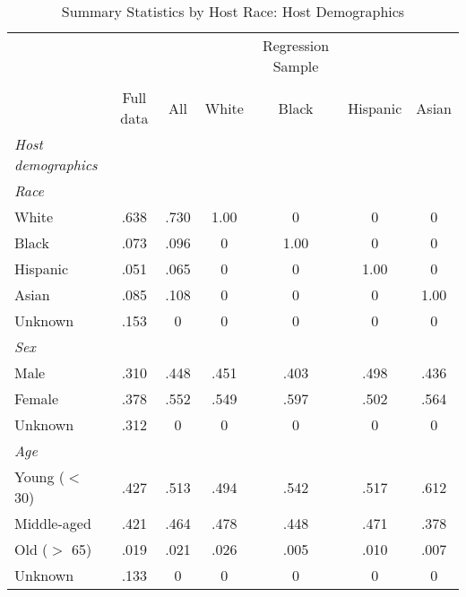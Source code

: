 {
	\begin{longtable}{l*{6}{c}}
		\caption{Summary Statistics by Host Race: Host Demographics}\\
		
		\hline
		&\multicolumn{1}{c}{}&\multicolumn{1}{c}{}&\multicolumn{1}{c}{}&\multicolumn{1}{c}{Regression Sample}&\multicolumn{1}{c}{}&\multicolumn{1}{c}{}\\
		\cline{3-7}\\
			&\multicolumn{1}{c}{Full data}&\multicolumn{1}{c}{All}&\multicolumn{1}{c}{White}&\multicolumn{1}{c}{Black}&\multicolumn{1}{c}{Hispanic}&\multicolumn{1}{c}{Asian}\\
		\hline\hline
		
		
		\textit{Host demographics} \\
		\hline 
		\textit{Race} \\
		\hspace{3mm}White     &.638 &      .730         &       1.00         &      0         &      0 	& 		0        \\
		\hspace{3mm}Black     & .073 &    .096       &       0         &      1.00         &      0 	& 		0         \\
		\hspace{3mm}Hispanic     &.051 &      .065         &       0         &      0         &      1.00 	& 	 0     \\
		\hspace{3mm}Asian     & .085  &   .108      &       0         &      0         &      0 	& 		1.00       \\
		\hspace{3mm}Unknown     &.153 &      0         &       0         &      0         &      0 	& 		0         \\
		[1em]
		\textit{Sex} \\
		\hspace{3mm}Male     & .310 &      .448         &       .451     &      .403         &      .498 	& 		.436        \\
		\hspace{3mm}Female     &.378 &      .552         &       .549        &      .597     &    .502 	& 		.564         \\
		\hspace{3mm}Unknown   & .312 &      0      &       0     &      0         &      0 	&	0         \\
		[1em]
		\textit{Age} \\
		\hspace{3mm}Young ($<$ 30)     &.427  &      .513    & .494      &  .542   &      .517    &    .612  \\
		\hspace{3mm}Middle-aged     & .421   &      .464   &   .478      &    .448    &      .471   &      .378 \\
		\hspace{3mm}Old ($>$ 65)     & .019   &      .021   &    .026    &       .005   &      .010    &      .007	\\
		\hspace{3mm}Unknown    &  .133   &   0     &    0    &       0     &      0     &      0 	\\
		[1em]


\end{longtable}}
